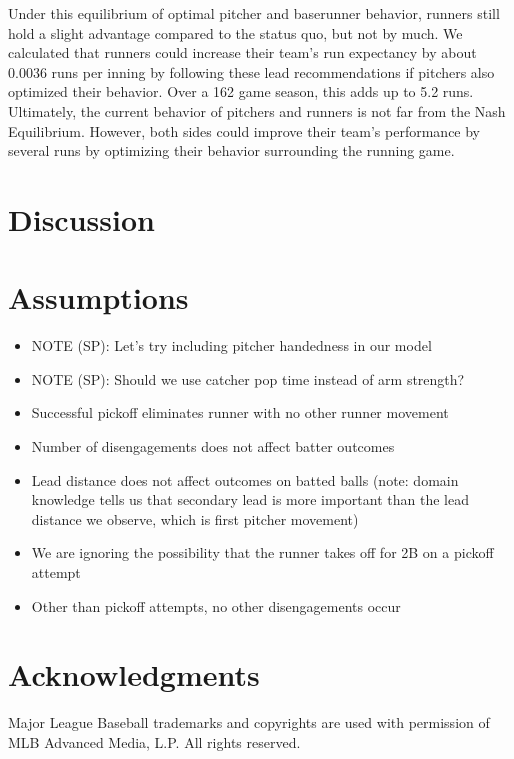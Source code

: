 \documentclass{article}
\begin{document}
      Under this equilibrium of optimal pitcher and baserunner behavior, runners still hold a slight advantage compared to the status quo, but not by much. We calculated that runners could increase their team's run expectancy by about 0.0036 runs per inning by following these lead recommendations if pitchers also optimized their behavior. Over a 162 game season, this adds up to 5.2 runs. Ultimately, the current behavior of pitchers and runners is not far from the Nash Equilibrium. However, both sides could improve their team's performance by several runs by optimizing their behavior surrounding the running game.

  \section{Discussion}

  \section{Assumptions}

    \begin{itemize}
      \item NOTE (SP): Let's try including pitcher handedness in our model
      \item NOTE (SP): Should we use catcher pop time instead of arm strength?
      \item Successful pickoff eliminates runner with no other runner movement
      \item Number of disengagements does not affect batter outcomes
      \item Lead distance does not affect outcomes on batted balls (note: domain knowledge tells us that secondary lead is more important than the lead distance we observe, which is first pitcher movement)
      \item We are ignoring the possibility that the runner takes off for 2B on a pickoff attempt
      \item Other than pickoff attempts, no other disengagements occur
    \end{itemize}

  \section{Acknowledgments}

    Major League Baseball trademarks and copyrights are used with permission of MLB Advanced Media, L.P. All rights reserved.

  
\end{document}

